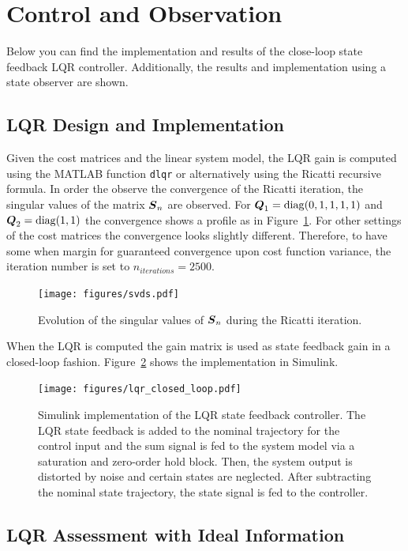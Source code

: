 
\section{Control and Observation}
Below you can find the implementation and results of the close-loop state feedback LQR controller.
Additionally, the results and implementation using a state observer are shown.
\subsection{LQR Design and Implementation}
Given the cost matrices and the linear system model, the LQR gain is computed using the MATLAB function \texttt{dlqr} or alternatively using the Ricatti recursive formula.
In order the observe the convergence of the Ricatti iteration, the singular values of the matrix $\boldsymbol{S}_n$ are observed.
For $\boldsymbol{Q}_1 = \mathop{\mathrm{diag}} (0, 1, 1, 1, 1)$ and $\boldsymbol{Q}_2 = \mathop{\mathrm{diag}} (1, 1)$ the convergence shows a profile as in Figure~\ref{fig:ricatti_svds}.
For other settings of the cost matrices the convergence looks slightly different.
Therefore, to have some when margin for guaranteed convergence upon cost function variance, the iteration number is set to $n_{iterations} = 2500$.

\begin{figure}[h]
	\centering
	\texttt{[image: figures/svds.pdf]}
	\caption{Evolution of the singular values of $\boldsymbol{S}_n$ during the Ricatti iteration.}
	\label{fig:ricatti_svds}
\end{figure}

When the LQR is computed the gain matrix is used as state feedback gain in a closed-loop fashion.
Figure~\ref{fig:lqr_closed} shows the implementation in Simulink.

\begin{figure}[h!]
	\centering
	\texttt{[image: figures/lqr\_closed\_loop.pdf]}
	\caption{Simulink implementation of the LQR state feedback controller. The LQR state feedback is added to the nominal trajectory for the control input and the sum signal is fed to the system model via a saturation and zero-order hold block. Then, the system output is distorted by noise and certain states are neglected. After subtracting the nominal state trajectory, the state signal is fed to the controller.}
	\label{fig:lqr_closed}
\end{figure}

\subsection{LQR Assessment with Ideal Information}

